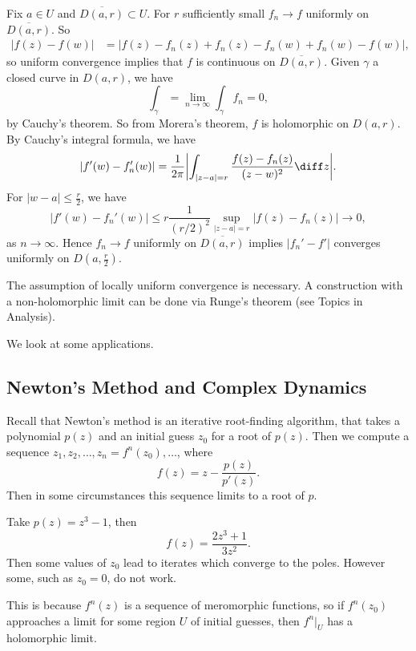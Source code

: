 \documentclass[12pt]{article}
\begin{document}
\begin{proofbox}
	Fix $a \in U$ and $\overline{D(a, r)} \subset U$. For $r$ sufficiently small $f_n \to f$ uniformly on $\overline{D(a, r)}$. So
	\begin{align*}
		|f(z)-f(w)| &= |f(z) - f_n(z) + f_n(z) - f_n(w) + f_n(w) - f(w)|,
	\end{align*}
	so uniform convergence implies that $f$ is continuous on $\overline{D(a, r)}$. Given $\gamma$ a closed curve in $D(a, r)$, we have
	\[
		\int_\gamma = \lim_{n \to \infty}\int_\gamma f_n = 0,
	\]
	by Cauchy's theorem. So from Morera's theorem, $f$ is holomorphic on $D(a, r)$. By Cauchy's integral formula, we have
	\begin{align*}
		|f'(w) - f_n'(w)| = \frac{1}{2\pi} \biggl| \int_{|z-a| = r} \frac{f(z) - f_n(z)}{(z-w)^2} \diff z \biggr|.
	\end{align*}
	For $|w-a| \le \frac{r}{2}$, we have
	\[
	|f'(w) - f_n'(w)| \le r \frac{1}{(r/2)^2} \sup_{|z-a|=r} |f(z) - f_n(z)| \to 0,
	\]
	as $n \to \infty$. Hence $f_n \to f$ uniformly on $\overline{D(a, r)}$ implies $|f_n' - f'|$ converges uniformly on $D(a, \frac{r}{2})$.
\end{proofbox}

\begin{remark}
	The assumption of locally uniform convergence is necessary. A construction with a non-holomorphic limit can be done via Runge's theorem (see Topics in Analysis).
\end{remark}

We look at some applications.

\subsection{Newton's Method and Complex Dynamics}
\label{sub:newtons_method_and_complex_dynamics}

Recall that Newton's method is an iterative root-finding algorithm, that takes a polynomial $p(z)$ and an initial guess $z_0$ for a root of $p(z)$. Then we compute a sequence $z_1, z_2, \ldots, z_n = f^{n}(z_0), \ldots$, where
\[
f(z) = z - \frac{p(z)}{p'(z)}.
\]
Then in some circumstances this sequence limits to a root of $p$.

\begin{exbox}
	Take $p(z) = z^3 - 1$, then
	\[
	f(z) = \frac{2z^3 + 1}{3z^2}.
	\]%
	Then some values of $z_0$ lead to iterates which converge to the poles. However some, such as $z_0 = 0$, do not work.

	This is because $f^{n}(z)$ is a sequence of meromorphic functions, so if $f^{n}(z_0)$ approaches a limit for some region $U$ of initial guesses, then $f^{n}|_U$ has a holomorphic limit.
\end{exbox}
\end{document}
